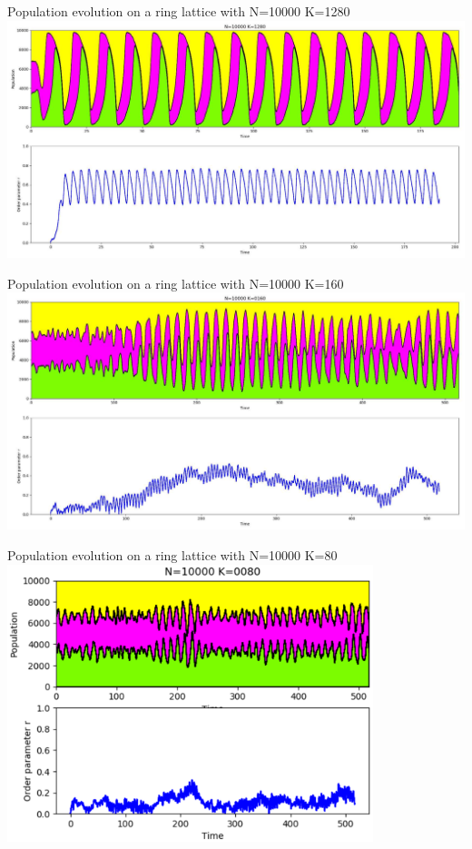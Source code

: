 \documentclass[serif,mathserif]{beamer}
\begin{document}
\begin{frame}
    \centering
    Population evolution on a ring lattice with N=10000 K=1280\\
    \vspace{0.8cm}
    \includegraphics[width=\textwidth]{pop-evolution-stacked-K_1280.eps}
\end{frame}

\begin{frame}
    \centering
    Population evolution on a ring lattice with N=10000 K=160\\
    \vspace{0.8cm}
    \includegraphics[width=\textwidth]{pop-evolution-stacked-K_160.eps}
\end{frame}

\begin{frame}
    \centering
    Population evolution on a ring lattice with N=10000 K=80\\
    \vspace{0.8cm}
    \includegraphics[width=0.8\textwidth]{pop-evolution-stacked-K_80.eps}
\end{frame}
\end{document}

